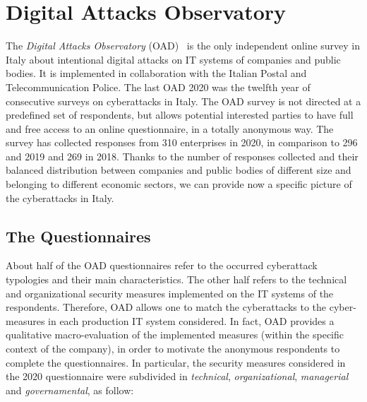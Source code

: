 \documentclass{easychair}
\begin{document}
\section{Digital Attacks Observatory}\label{sec:DigitalAttacksObservatory}

The \textit{Digital Attacks Observatory} (OAD)~\cite{oadweb} is the only independent online survey in Italy about intentional digital attacks on IT systems of companies and public
bodies. It is implemented in collaboration with the Italian Postal and Telecommunication Police.
The last OAD 2020 was the twelfth year of consecutive surveys on cyberattacks in Italy.
The OAD survey is not directed at a predefined set of respondents, but allows potential interested
parties to have full and free access to an online questionnaire, in a totally anonymous way.
The survey has collected responses from 310 enterprises in 2020, in comparison
to 296 and 2019 and 269 in 2018.
Thanks to the number of responses collected and their balanced distribution between companies and public bodies of different size and belonging to different economic
sectors, we can provide now a specific picture of the cyberattacks in Italy.

\subsection{The Questionnaires}

About half of the OAD questionnaires refer to the occurred
cyberattack typologies and their main characteristics.
The other half refers to the technical and organizational security measures implemented
on the IT systems of the respondents. 
Therefore, OAD allows one to match the cyberattacks to the cyber-measures in each production
IT system considered. 
In fact, OAD provides a qualitative macro-evaluation of the implemented measures
(within the specific context of the company), in order to motivate the anonymous respondents
to complete the questionnaires.
In particular, the security measures considered in the 2020 questionnaire were subdivided
in \emph{technical}, \emph{organizational}, \emph{managerial} and \emph{governamental}, as follow:
\end{document}

